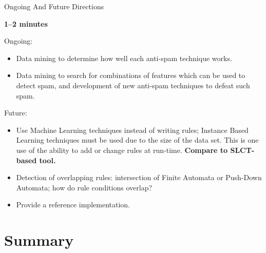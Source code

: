 \documentclass{beamer}
\newcommand{\timingnote}[1]{%
    \textbf{#1}%
}
\begin{document}
\begin{frame}{Ongoing And Future Directions}

    \timingnote{1--2 minutes}

    Ongoing:

    \begin{itemize}

        \item Data mining to determine how well each anti-spam technique
            works.

        \item Data mining to search for combinations of features which can
            be used to detect spam, and development of new anti-spam
            techniques to defeat such spam.

    \end{itemize}

    Future:

    \begin{itemize}

        \item Use Machine Learning techniques instead of writing rules;
            Instance Based Learning techniques must be used due to the size
            of the data set.  This is one use of the ability to add or
            change rules at run-time.  \timingnote{Compare to SLCT-based
            tool.}

        \item Detection of overlapping rules: intersection of Finite
            Automata or Push-Down Automata; how do rule conditions overlap?

        \item Provide a reference implementation.

    \end{itemize}

\end{frame}


\section{Summary}
\end{document}
